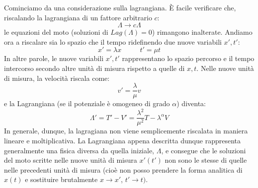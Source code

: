 \documentclass[a4paper,openany]{article}
\begin{document}
	Cominciamo da una considerazione sulla lagrangiana. È facile verificare che, riscalando la lagrangiana di un fattore arbitrario $c$:
	$$
	\Lambda \rightarrow c\Lambda
	$$
	le equazioni del moto (soluzioni di $Lag(\Lambda) = 0$) rimangono inalterate.
	Andiamo ora a riscalare sia lo spazio che il tempo ridefinendo due nuove variabili $x',t'$:
	\begin{equation}
		x' = \lambda x \>\>\>\>\>\>\>\>\>\>\>\> t' = \mu t
	\end{equation}
	In altre parole, le nuove variabili $x',t'$ rappresentano lo spazio percorso e il tempo intercorso secondo altre unità di misura rispetto a quelle di $x,t$. Nelle nuove unità di misura, la velocità riscala come:
	$$
	v' = \dfrac{\lambda}{\mu}v
	$$
	e la Lagrangiana (se il potenziale è omogeneo di grado $\alpha$) diventa:
	$$
	\Lambda' = T' - V' = \dfrac{\lambda^{2}}{\mu^{2}}T-\lambda^{\alpha}V
	$$
	In generale, dunque, la lagragiana non viene semplicemente riscalata in maniera lineare e moltiplicativa. La Lagrangiana appena descritta dunque rappresenta generalmente una fisica diversa da quella iniziale, $\Lambda$, e consegue che le soluzioni del moto scritte nelle nuove unità di misura $x'(t')$ non sono le stesse di quelle nelle precedenti unità di misura (cioè non posso prendere la forma analitica di $x(t)$ e sostituire brutalmente $x\rightarrow x'$, $t'\rightarrow t)$.
	\begin{comment}
		A titolo d'esempio, consideriamo un oscillatore armonico in cui:
		$$
		x(t) = A\sin(\omega t)
		$$
		dove ad esempio $x$ è espresso in metri e $t$ in secondi. Se volessi passare ad una descrizione in $km$ e $h$, potrei semplicemente scrivere:
		$$
		x'(t') = A'\sin(\omega t')
		$$
		dove $A'$ è una condizione iniziale fissata da $x'(0) = \lambda x(0) = \lambda A$, dunque:
		$$
		x'(t') = \lambda A \sin(\omega t')
		$$
		che è la soluzione di una lagrangiana quadratica prodotta dall'oscillatore armonico (e $\omega$ è la stessa essendo ricavata dalla forma dell'equazione differenziale che definisce il problema). Ma questa soluzione non va bene. Infatti, se
		$$
		\lambda = \dfrac{1}{1000} \>\>\>\>\>\>\>\> \mu = \dfrac{1}{3600}
		$$
		al tempo $t_{0}= \dfrac{1}{\omega}, t'_{0} = \dfrac{1}{3600\omega}$ il corpo si trova a:
		\begin{equation}
			\begin{cases}
				x(t_{0}) = A\sin(1) \\
				x'(t'_{0}) = \dfrac{1}{1000}A\sin\Bigl(\dfrac{1}{3600}\Bigl) 
			\end{cases}
		\end{equation}
		I due valori di $x,x'$ devono rappresentare la stessa posizione, quindi devono essere l'uno $1000$ l'altro. Questo è evidentemente falso (gli argomento dei due seni sono diversi). Il problema, qui, è dovuto al fatto che nella soluzione corretta ci saremmo aspettati un fattore $\mu$ anche dentro all'argomento del seno, dovuto al fatto che anche $\omega$ dipende dalla scelta delle unità di misura.
	\end{comment}
\end{document}
